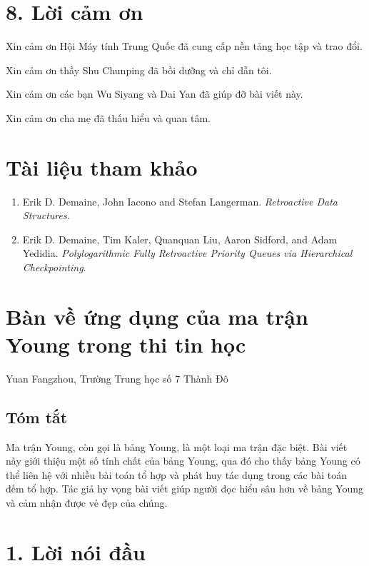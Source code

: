 \documentclass[11pt]{article}
\begin{document}
\section*{8. Lời cảm ơn}

Xin cảm ơn Hội Máy tính Trung Quốc đã cung cấp nền tảng học tập và trao đổi.

Xin cảm ơn thầy Shu Chunping đã bồi dưỡng và chỉ dẫn tôi.

Xin cảm ơn các bạn Wu Siyang và Dai Yan đã giúp đỡ bài viết này.

Xin cảm ơn cha mẹ đã thấu hiểu và quan tâm.

\section*{Tài liệu tham khảo}

\begin{enumerate}
  \item Erik D. Demaine, John Iacono and Stefan Langerman.
        \emph{Retroactive Data Structures}.
  \item Erik D. Demaine, Tim Kaler, Quanquan Liu, Aaron Sidford, and Adam
        Yedidia. \emph{Polylogarithmic Fully Retroactive Priority Queues via
        Hierarchical Checkpointing}.
\end{enumerate}

\clearpage
\section*{Bàn về ứng dụng của ma trận Young trong thi tin học}

\begin{center}
Yuan Fangzhou, Trường Trung học số 7 Thành Đô
\end{center}

\subsection*{Tóm tắt}

Ma trận Young, còn gọi là bảng Young, là một loại ma trận đặc biệt. Bài viết
này giới thiệu một số tính chất của bảng Young, qua đó cho thấy bảng Young có
thể liên hệ với nhiều bài toán tổ hợp và phát huy tác dụng trong các bài toán
đếm tổ hợp. Tác giả hy vọng bài viết giúp người đọc hiểu sâu hơn về bảng Young
và cảm nhận được vẻ đẹp của chúng.

\section*{1. Lời nói đầu}
\end{document}
